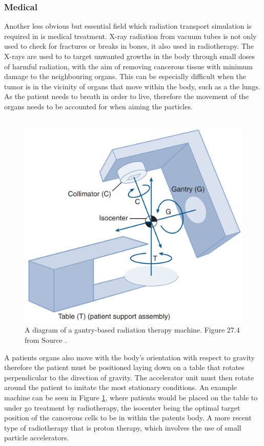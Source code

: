 \documentclass[12pt,a4paper]{article}
\begin{document}
\subsubsection{Medical}
\noindent Another less obvious but essential field which radiation transport simulation is required in is medical treatment. X-ray radiation from vacuum tubes is not only used to check for fractures or breaks in bones, it also used in radiotherapy. The X-rays are used to to target unwanted growths in the body through small doses of harmful radiation, with the aim of removing cancerous tissue with minimum damage to the neighbouring organs. This can be especially difficult when the tumor is in the vicinity of organs that move within the body, such as a the lungs. As the patient needs to breath in order to live, therefore the movement of the organs needs to be accounted for when aiming the particles.
\\\\
\begin{figure}[h!]
\centering
\includegraphics[scale=0.35]{Images//introduction//radiotherapy.png}
\caption[width=\columnwidth]{A diagram of a gantry-based radiation therapy machine. Figure 27.4 from Source \cite{cancer}.}
\label{cancer}
\end{figure}

\noindent A patients organs also move with the body's orientation with respect to gravity therefore the patient must be positioned laying down on a table that rotates perpendicular to the direction of gravity. The accelerator unit must then rotate around the patient to imitate the most stationary conditions. An example machine can be seen in Figure \ref{cancer}, where patients would be placed on the table to under go treatment by radiotherapy, the isocenter being the optimal target position of the cancerous cells to be in within the patents body.  A more recent type of radiotherapy that is proton therapy, which involves the use of small particle accelerators.
\end{document}
